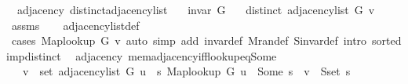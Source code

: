 \begin{isabellebody}
{\isafoldproof}%
%
\isadelimproof
\isanewline
%
\endisadelimproof
\isanewline
{}\isamarkupfalse%
\ {\isacharparenleft}{\kern0pt}\ adjacency{\isacharparenright}{\kern0pt}\ distinct{\isacharunderscore}{\kern0pt}adjacency{\isacharunderscore}{\kern0pt}list{\isacharcolon}{\kern0pt}\isanewline
\ \ \ {\isachardoublequoteopen}invar\ G{\isachardoublequoteclose}\isanewline
\ \ \ {\isachardoublequoteopen}distinct\ {\isacharparenleft}{\kern0pt}adjacency{\isacharunderscore}{\kern0pt}list\ G\ v{\isacharparenright}{\kern0pt}{\isachardoublequoteclose}\isanewline
%
\isadelimproof
\ \ %
\endisadelimproof
%
\isatagproof
{}\isamarkupfalse%
\ assms\isanewline
\ \ \isamarkupfalse%
\ adjacency{\isacharunderscore}{\kern0pt}list{\isacharunderscore}{\kern0pt}def\isanewline
\ \ \isamarkupfalse%
\ {\isacharparenleft}{\kern0pt}cases\ {\isachardoublequoteopen}Map{\isacharunderscore}{\kern0pt}lookup\ G\ v{\isachardoublequoteclose}{\isacharparenright}{\kern0pt}\ {\isacharparenleft}{\kern0pt}auto\ simp\ add{\isacharcolon}{\kern0pt}\ invar{\isacharunderscore}{\kern0pt}def\ M{\isachardot}{\kern0pt}ran{\isacharunderscore}{\kern0pt}def\ S{\isachardot}{\kern0pt}invar{\isacharunderscore}{\kern0pt}def\ intro{\isacharcolon}{\kern0pt}\ sorted{\isacharunderscore}{\kern0pt}imp{\isacharunderscore}{\kern0pt}distinct{\isacharparenright}{\kern0pt}%
\endisatagproof
{\isafoldproof}%
%
\isadelimproof
\isanewline
%
\endisadelimproof
%
\isadeliminvisible
\isanewline
%
\endisadeliminvisible
%
\isataginvisible
{}\isamarkupfalse%
\ {\isacharparenleft}{\kern0pt}\ adjacency{\isacharparenright}{\kern0pt}\ mem{\isacharunderscore}{\kern0pt}adjacency{\isacharunderscore}{\kern0pt}iff{\isacharunderscore}{\kern0pt}lookup{\isacharunderscore}{\kern0pt}eq{\isacharunderscore}{\kern0pt}Some{\isacharcolon}{\kern0pt}\isanewline
\ \ \ {\isachardoublequoteopen}v\ {\isasymin}\ set\ {\isacharparenleft}{\kern0pt}adjacency{\isacharunderscore}{\kern0pt}list\ G\ u{\isacharparenright}{\kern0pt}\ {\isasymlongleftrightarrow}\ {\isacharparenleft}{\kern0pt}{\isasymexists}s{\isachardot}{\kern0pt}\ Map{\isacharunderscore}{\kern0pt}lookup\ G\ u\ {\isacharequal}{\kern0pt}\ Some\ s\ {\isasymand}\ v\ {\isasymin}\ S{\isachardot}{\kern0pt}set\ s{\isacharparenright}{\kern0pt}{\isachardoublequoteclose}%
\endisataginvisible
{\isafoldinvisible}%
%
\isadeliminvisible
\isanewline
%
\endisadeliminvisible
%
\isadelimproof
\ \ %
\endisadelimproof
%
\isatagproof
{}\isamarkupfalse%

\end{isabellebody}
